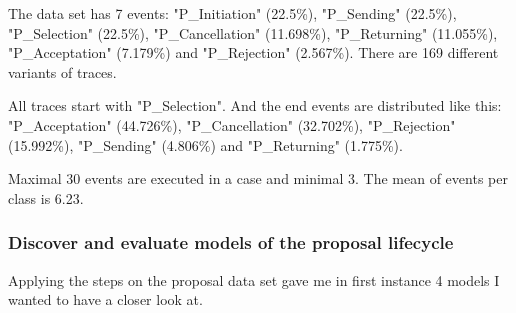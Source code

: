 The data set has 7 events: 
"P\_Initiation" (22.5\%), "P\_Sending" (22.5\%), "P\_Selection" (22.5\%), "P\_Cancellation" (11.698\%), "P\_Returning" (11.055\%), "P\_Acceptation" (7.179\%) and "P\_Rejection" (2.567\%).
There are 169 different variants of traces.

All traces start with "P\_Selection". And the end events are distributed like this: 
"P\_Acceptation" (44.726\%), "P\_Cancellation" (32.702\%), "P\_Rejection" (15.992\%), "P\_Sending" (4.806\%) and "P\_Returning" (1.775\%). 

Maximal 30 events are executed in a case and minimal 3. The mean of events per class is 6.23.


\subsubsection{Discover and evaluate models of the proposal lifecycle}

Applying the steps on the proposal data set gave me in first instance 4 models I wanted to have a closer look at.

